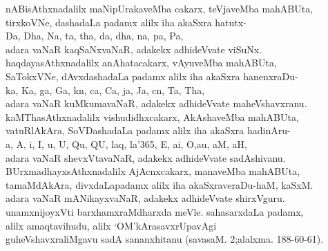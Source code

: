 \begin{entry}
\medskip
\begin{shl}
nABisAthxnadalilx maNipUrakaveMba cakarx, teVjaveMba mahABUta,\\[2pt]
tirxkoVNe, dashadaLa padamx alilx iha akaSxra hatutx-\\[2pt]
Da, Dha, Na, ta, tha, da, dha, na, pa, Pa,\\[2pt]
adara vaNaR kaqSaNxvaNaR, adakekx adhideVvate viSuNx.\\[2pt]
haqdayasAthxnadalilx anAhatacakarx, vAyuveMba mahABUta,\\[2pt]
SaTokxVNe, dAvxdashadaLa padamx alilx iha akaSxra hanenxraDu-\\[2pt]
ka, Ka, ga, Ga, kn, ca, Ca, ja, Ja, cn, Ta, Tha,\\[2pt]
adara vaNaR kuMkumavaNaR, adakekx adhideVvate maheVshavxranu.\\[2pt]
kaMThasAthxnadalilx vishudidhxcakarx, AkAshaveMba mahABUta, \\[2pt]
vatuRlAkAra, SoVDashadaLa padamx alilx iha akaSxra hadinAru-\\[2pt]
a, A, i, I, u, U, Qu, QU, laq, la\char'365, E, ai, O,\break au, aM, aH,\\[2pt]
adara vaNaR shevxVtavaNaR, adakekx adhideVvate sadAshivanu.\\[4pt]
BUrxmadhayxsAthxnadalilx AjAcnxcakarx, manaveMba mahABUta, \\[2pt]
tamaMdAkAra, divxdaLapadamx alilx iha akaSxraveraDu-haM, kaSxM.\\[2pt]
adara vaNaR mANikayxvaNaR, adakekx adhideVvate shirxVguru.\\[2pt]
unamxnijoyxVti barxhamxraMdharxda meVle. sahasarxdaLa padamx,\\[2pt]
alilx amaqtavihudu, alilx `OM'kArasavxrUpavAgi\\[2pt]
guheVshavxraliMgavu sadA sananxhitanu (savasaM. 2;\break alalxma. 188-60-61).
\end{shl}
\end{entry}


